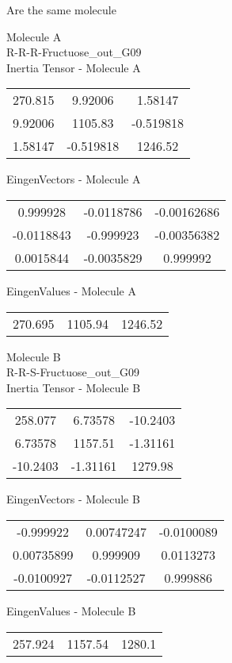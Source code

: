 \begin{center}
\vtab
\vtab
\textcolor{NavyBlue}{\Large Are the same molecule}
\end{center}
\newpage
\begin{multicols}{2}
\begin{center}
Molecule A \\ 
R-R-R-Fructuose\_out\_G09
\\
Inertia Tensor - Molecule A \\
\vtab
\begin{tabular}{|c c c|}
270.815	 & 	9.92006	 & 	1.58147	 \\
9.92006	 & 	1105.83	 & 	-0.519818	 \\
1.58147	 & 	-0.519818	 & 	1246.52
\end{tabular}

\vtab
 EingenVectors - Molecule A     \\
\vtab
\begin{tabular}{|c c c|}
0.999928	 & 	-0.0118786	 & 	-0.00162686	 \\
-0.0118843	 & 	-0.999923	 & 	-0.00356382	 \\
0.0015844	 & 	-0.0035829	 & 	0.999992
\end{tabular}

\vtab
 EingenValues - Molecule A     \\
\vtab
\begin{tabular}{|c c c|}
270.695	 & 	1105.94	 & 	1246.52
\end{tabular}
\columnbreak

Molecule B \\ 
R-R-S-Fructuose\_out\_G09
\\
Inertia Tensor - Molecule B \\
\vtab
\begin{tabular}{|c c c|}
258.077	 & 	6.73578	 & 	-10.2403	 \\
6.73578	 & 	1157.51	 & 	-1.31161	 \\
-10.2403	 & 	-1.31161	 & 	1279.98
\end{tabular}

\vtab
 EingenVectors - Molecule B     \\
\vtab
\begin{tabular}{|c c c|}
-0.999922	 & 	0.00747247	 & 	-0.0100089	 \\
0.00735899	 & 	0.999909	 & 	0.0113273	 \\
-0.0100927	 & 	-0.0112527	 & 	0.999886
\end{tabular}

\vtab
 EingenValues - Molecule B     \\
\vtab
\begin{tabular}{|c c c|}
257.924	 & 	1157.54	 & 	1280.1
\end{tabular}

\end{center}
\end{multicols}
